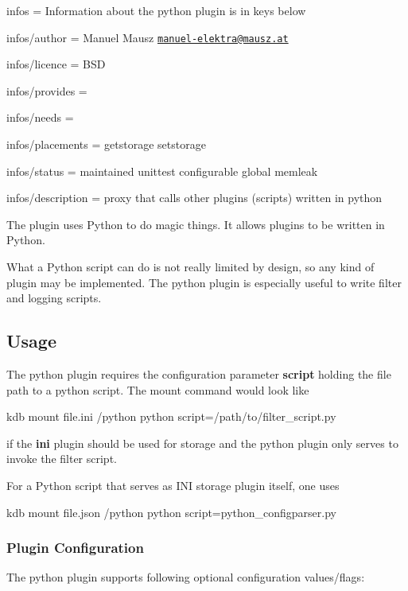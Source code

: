 
\begin{DoxyItemize}
\item infos = Information about the python plugin is in keys below
\item infos/author = Manuel Mausz \href{mailto:manuel-elektra@mausz.at}{\tt manuel-\/elektra@mausz.\+at}
\item infos/licence = B\+SD
\item infos/provides =
\item infos/needs =
\item infos/placements = getstorage setstorage
\item infos/status = maintained unittest configurable global memleak
\item infos/description = proxy that calls other plugins (scripts) written in python
\end{DoxyItemize}

The plugin uses Python to do magic things. It allows plugins to be written in Python.

What a Python script can do is not really limited by design, so any kind of plugin may be implemented. The python plugin is especially useful to write filter and logging scripts.

\subsection*{Usage}

The python plugin requires the configuration parameter {\bfseries script} holding the file path to a python script. The mount command would look like \begin{DoxyVerb}kdb mount file.ini /python python script=/path/to/filter_script.py
\end{DoxyVerb}


if the {\bfseries ini} plugin should be used for storage and the python plugin only serves to invoke the filter script.

For a Python script that serves as I\+NI storage plugin itself, one uses \begin{DoxyVerb}kdb mount file.json /python python script=python_configparser.py
\end{DoxyVerb}


\subsubsection*{Plugin Configuration}

The python plugin supports following optional configuration values/flags\+:


